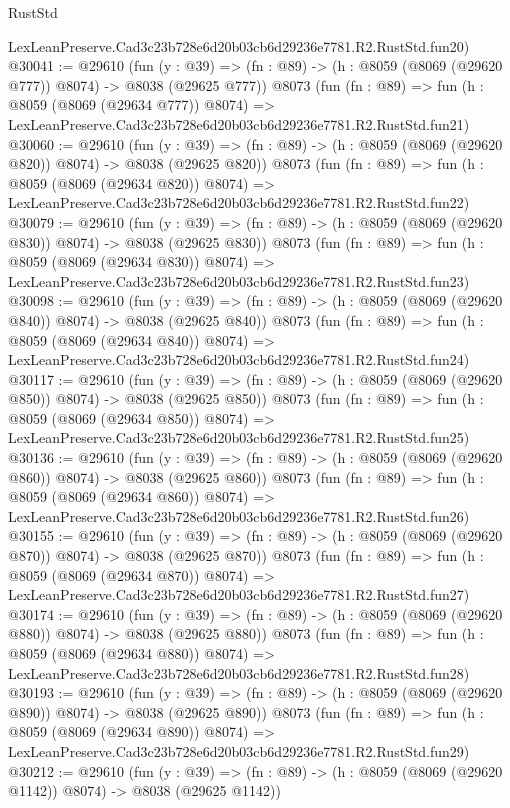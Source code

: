 \begin{lexlean}{RustStd}
\begin{coremodule}
    LexLeanPreserve.Cad3c23b728e6d20b03cb6d29236e7781.R2.RustStd.fun20)
@30041 := @29610
    (fun (y : @39) => (fn : @89) -> (h : @8059 (@8069 (@29620 @777)) @8074) -> @8038 (@29625 @777))
    @8073
    (fun (fn : @89) =>
    fun (h : @8059 (@8069 (@29634 @777)) @8074) =>
    LexLeanPreserve.Cad3c23b728e6d20b03cb6d29236e7781.R2.RustStd.fun21)
@30060 := @29610
    (fun (y : @39) => (fn : @89) -> (h : @8059 (@8069 (@29620 @820)) @8074) -> @8038 (@29625 @820))
    @8073
    (fun (fn : @89) =>
    fun (h : @8059 (@8069 (@29634 @820)) @8074) =>
    LexLeanPreserve.Cad3c23b728e6d20b03cb6d29236e7781.R2.RustStd.fun22)
@30079 := @29610
    (fun (y : @39) => (fn : @89) -> (h : @8059 (@8069 (@29620 @830)) @8074) -> @8038 (@29625 @830))
    @8073
    (fun (fn : @89) =>
    fun (h : @8059 (@8069 (@29634 @830)) @8074) =>
    LexLeanPreserve.Cad3c23b728e6d20b03cb6d29236e7781.R2.RustStd.fun23)
@30098 := @29610
    (fun (y : @39) => (fn : @89) -> (h : @8059 (@8069 (@29620 @840)) @8074) -> @8038 (@29625 @840))
    @8073
    (fun (fn : @89) =>
    fun (h : @8059 (@8069 (@29634 @840)) @8074) =>
    LexLeanPreserve.Cad3c23b728e6d20b03cb6d29236e7781.R2.RustStd.fun24)
@30117 := @29610
    (fun (y : @39) => (fn : @89) -> (h : @8059 (@8069 (@29620 @850)) @8074) -> @8038 (@29625 @850))
    @8073
    (fun (fn : @89) =>
    fun (h : @8059 (@8069 (@29634 @850)) @8074) =>
    LexLeanPreserve.Cad3c23b728e6d20b03cb6d29236e7781.R2.RustStd.fun25)
@30136 := @29610
    (fun (y : @39) => (fn : @89) -> (h : @8059 (@8069 (@29620 @860)) @8074) -> @8038 (@29625 @860))
    @8073
    (fun (fn : @89) =>
    fun (h : @8059 (@8069 (@29634 @860)) @8074) =>
    LexLeanPreserve.Cad3c23b728e6d20b03cb6d29236e7781.R2.RustStd.fun26)
@30155 := @29610
    (fun (y : @39) => (fn : @89) -> (h : @8059 (@8069 (@29620 @870)) @8074) -> @8038 (@29625 @870))
    @8073
    (fun (fn : @89) =>
    fun (h : @8059 (@8069 (@29634 @870)) @8074) =>
    LexLeanPreserve.Cad3c23b728e6d20b03cb6d29236e7781.R2.RustStd.fun27)
@30174 := @29610
    (fun (y : @39) => (fn : @89) -> (h : @8059 (@8069 (@29620 @880)) @8074) -> @8038 (@29625 @880))
    @8073
    (fun (fn : @89) =>
    fun (h : @8059 (@8069 (@29634 @880)) @8074) =>
    LexLeanPreserve.Cad3c23b728e6d20b03cb6d29236e7781.R2.RustStd.fun28)
@30193 := @29610
    (fun (y : @39) => (fn : @89) -> (h : @8059 (@8069 (@29620 @890)) @8074) -> @8038 (@29625 @890))
    @8073
    (fun (fn : @89) =>
    fun (h : @8059 (@8069 (@29634 @890)) @8074) =>
    LexLeanPreserve.Cad3c23b728e6d20b03cb6d29236e7781.R2.RustStd.fun29)
@30212 := @29610
    (fun (y : @39) =>
    (fn : @89) -> (h : @8059 (@8069 (@29620 @1142)) @8074) -> @8038 (@29625 @1142))

\end{coremodule}
\end{lexlean}
